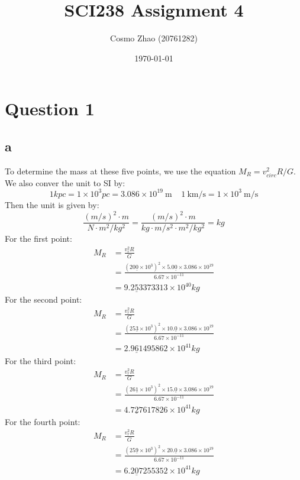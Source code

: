 \documentclass[11pt]{article}
\title{ SCI238 Assignment 4}
\author{ Cosmo Zhao (20761282) }
\date{\today}
\newcommand{\sci}[1]{\times 10^{#1}}
\begin{document}
\maketitle
\pagebreak
\section*{Question 1}
\subsection*{a}
To determine the mass at these five points, we use the equation $M_R = v_{circ}^2 R / G$. We also conver the unit to SI by:
$$
1 kpc = 1 \sci{3} pc = 3.086 \sci{19} \SI[]{}[]{\m} \;\;\;\; 1 \SI[per-mode=symbol]{}{\km\per\s} = 1 \sci{3} \SI[per-mode=symbol]{}{\m\per\s}
$$
Then the unit is given by:
$$
\frac{(m/s)^2 \cdot m}{N\cdot m^2 / kg^2} = \frac{(m/s)^2 \cdot m}{kg \cdot m / s^2 \cdot m^2 / kg^2} = kg 
$$
For the first point:
$$
\begin{aligned}
M_R &= \frac{v_r^2 R}{G} \\
&= \frac{(20\underline{0} \sci{3})^2 \times 5.0\underline{0} \times 3.086 \sci{19}}{6.67 \sci{-11}}\\
&= 9.2\underline{5}3373313 \sci{40} kg
\end{aligned}
$$ 
For the second point:
$$
\begin{aligned}
M_R &= \frac{v_r^2 R}{G} \\
&= \frac{(25\underline{3} \sci{3})^2 \times 10.\underline{0} \times 3.086 \sci{19}}{6.67 \sci{-11}}\\
&= 2.9\underline{6}1495862\sci{41} kg
\end{aligned}
$$
For the third point:
$$
\begin{aligned}
M_R &= \frac{v_r^2 R}{G} \\
&= \frac{(26\underline{1} \sci{3})^2 \times 15.\underline{0} \times 3.086 \sci{19}}{6.67 \sci{-11}}\\
&= 4.7\underline{2}7617826 \sci{41} kg
\end{aligned}
$$
For the fourth point:
$$
\begin{aligned}
M_R &= \frac{v_r^2 R}{G} \\
&= \frac{(25\underline{9} \sci{3})^2 \times 20.\underline{0} \times 3.086 \sci{19}}{6.67 \sci{-11}}\\
&= 6.2\underline{0}7255352 \sci{41} kg
\end{aligned}
$$
\end{document}
